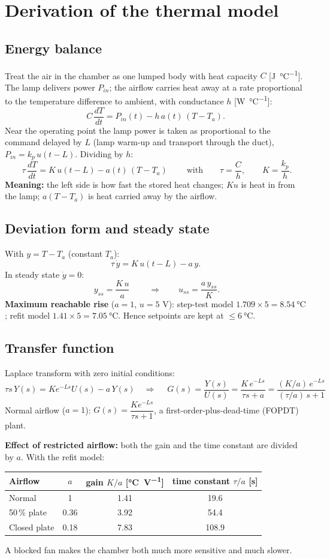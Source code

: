 \documentclass[11pt,a4paper]{article}
\begin{document}
\section{Derivation of the thermal model}

\subsection{Energy balance}
Treat the air in the chamber as one lumped body with heat capacity $C$ [\si{J\per\celsius}].
The lamp delivers power $P_{in}$; the airflow carries heat away at a rate proportional to the
temperature difference to ambient, with conductance $h$ [\si{W\per\celsius}]:
\[
C\,\frac{dT}{dt} = P_{in}(t) - h\,a(t)\,(T - T_a).
\]
Near the operating point the lamp power is taken as proportional to the command delayed by $L$
(lamp warm-up and transport through the duct), $P_{in} = k_p\,u(t-L)$. Dividing by $h$:
\[
\boxed{\;\tau\,\frac{dT}{dt} = K\,u(t-L) - a(t)\,(T - T_a)\;}
\qquad\text{with}\qquad
\tau = \frac{C}{h},\qquad K = \frac{k_p}{h}.
\]
\textbf{Meaning:} the left side is how fast the stored heat changes; $K u$ is heat in from the lamp;
$a(T-T_a)$ is heat carried away by the airflow.

\subsection{Deviation form and steady state}
With $y = T - T_a$ (constant $T_a$):
\[
\tau\,\dot y = K\,u(t-L) - a\,y.
\]
In steady state $\dot y = 0$:
\[
\boxed{\;y_{ss} = \frac{K\,u}{a}\;}
\qquad\Rightarrow\qquad
u_{ss} = \frac{a\,y_{ss}}{K}.
\]
\textbf{Maximum reachable rise} ($a=1$, $u = 5$ V): step-test model $1.709\times5 = \SI{8.54}{\celsius}$;
refit model $1.41\times5 = \SI{7.05}{\celsius}$. Hence setpoints are kept at $\le \SI{+6}{\celsius}$.

\subsection{Transfer function}
Laplace transform with zero initial conditions:
\[
\tau s\,Y(s) = K e^{-Ls}U(s) - a\,Y(s)
\quad\Rightarrow\quad
\boxed{\;G(s) = \frac{Y(s)}{U(s)} = \frac{K\,e^{-Ls}}{\tau s + a} = \frac{(K/a)\,e^{-Ls}}{(\tau/a)\,s + 1}\;}
\]
Normal airflow ($a=1$): $G(s) = \dfrac{K e^{-Ls}}{\tau s + 1}$, a first-order-plus-dead-time (FOPDT) plant.

\textbf{Effect of restricted airflow:} both the gain and the time constant are divided by $a$.
With the refit model:
\begin{center}
\begin{tabular}{@{}lccc@{}}
\toprule
Airflow & $a$ & gain $K/a$ [\si{\celsius\per\volt}] & time constant $\tau/a$ [s]\\
\midrule
Normal & 1 & 1.41 & 19.6\\
50\,\% plate & 0.36 & 3.92 & 54.4\\
Closed plate & 0.18 & 7.83 & 108.9\\
\bottomrule
\end{tabular}
\end{center}
A blocked fan makes the chamber both much more sensitive and much slower.
\end{document}
